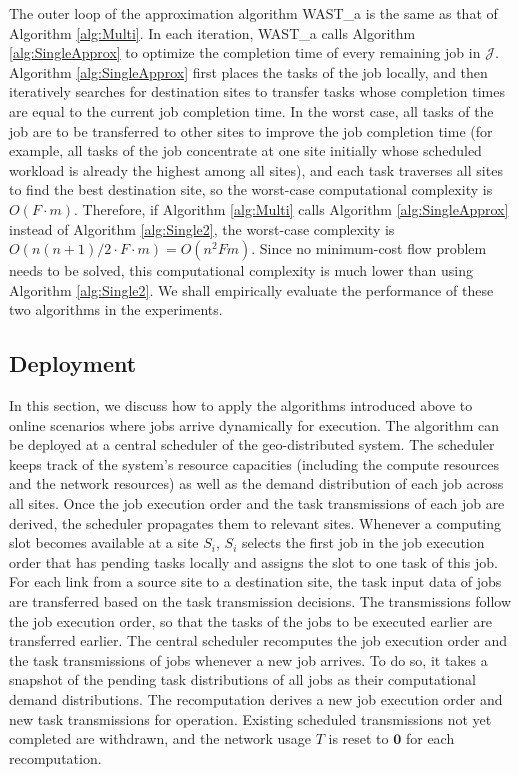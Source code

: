 The outer loop of the approximation algorithm WAST\_a is the same as that of Algorithm \ref{alg:Multi}. In each iteration, WAST\_a calls Algorithm \ref{alg:SingleApprox} to optimize the completion time of every remaining job in $\mathcal{J}$. Algorithm \ref{alg:SingleApprox} first places the tasks of the job locally, and then iteratively searches for destination sites to transfer tasks whose completion times are equal to the current job completion time. In the worst case, all tasks of the job are to be transferred to other sites to improve the job completion time (for example, all tasks of the job concentrate at one site initially whose scheduled workload is already the highest among all sites), and each task traverses all sites to find the best destination site, so the worst-case computational complexity is $O(F \cdot m)$. Therefore, if Algorithm \ref{alg:Multi} calls Algorithm \ref{alg:SingleApprox} instead of Algorithm \ref{alg:Single2}, the worst-case complexity is $O(n(n+1)/2\cdot F\cdot m)=O(n^2Fm)$. Since no minimum-cost flow problem needs to be solved, this computational complexity is much lower than using Algorithm \ref{alg:Single2}. We shall empirically evaluate the performance of these two algorithms in the experiments.

\subsection{Deployment}
\label{sec4:deploy}
In this section, we discuss how to apply the algorithms introduced above to online scenarios where jobs arrive dynamically for execution. The algorithm can be deployed at a central scheduler of the geo-distributed system. The scheduler keeps track of the system's resource capacities (including the compute resources and the network resources) as well as the demand distribution of each job across all sites. Once the job execution order and the task transmissions of each job are derived, the scheduler propagates them to relevant sites. Whenever a computing slot becomes available at a site $S_i$, $S_i$ selects the first job in the job execution order that has pending tasks locally and assigns the slot to one task of this job. For each link from a source site to a destination site, the task input data of jobs are transferred based on the task transmission decisions. The transmissions follow the job execution order, so that the tasks of the jobs to be executed earlier are transferred earlier. The central scheduler recomputes the job execution order and the task transmissions of jobs whenever a new job arrives. To do so, it takes a snapshot of the pending task distributions of all jobs as their computational demand distributions. The recomputation derives a new job execution order and new task transmissions for operation. Existing scheduled transmissions not yet completed are withdrawn, and the network usage $T$ is reset to $\textbf{0}$ for each recomputation.


